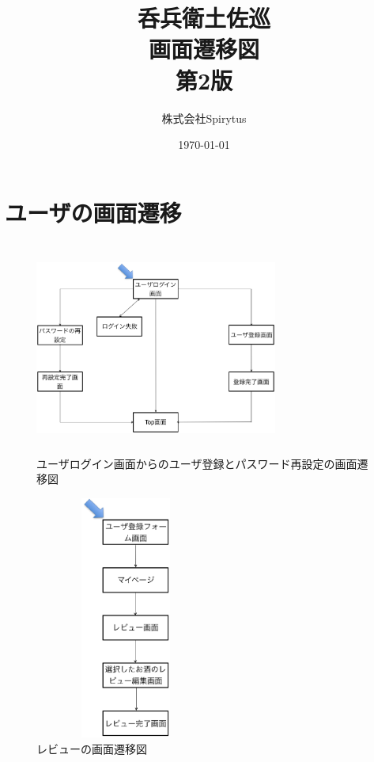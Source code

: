 \documentclass[a4j,titlepage]{jarticle}
\title{呑兵衛土佐巡\\
画面遷移図\\
第2版}
\author{株式会社Spirytus}
\date{\today}
\begin{document}
\maketitle


\section{ユーザの画面遷移}

\begin {figure}[!htbp]
    \begin{center}
    \includegraphics [height=7cm, width=8cm]{pass.eps}
    \caption {ユーザログイン画面からのユーザ登録とパスワード再設定の画面遷移図}
    \label {fig:pass}
    \end{center}
\end {figure}




\begin {figure}[!htbp]
    \begin{center}
    \includegraphics [height=8cm, width=6cm]{rebyu.eps}
    \caption {レビューの画面遷移図}
    \label {fig:rebyu}
    \end{center}
\end {figure}
\end{document}
